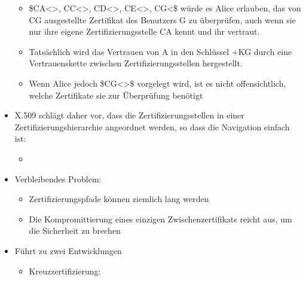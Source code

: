\documentclass[a4paper]{article}
\begin{document}
\begin{multicols}{3}
\begin{itemize}
              \begin{itemize}
                  \item
                        \$CA\textless{}\textgreater, CC\textless{}\textgreater,
                        CD\textless{}\textgreater, CE\textless{}\textgreater,
                        CG\textless{}\$ würde es Alice erlauben, das von CG ausgestellte
                        Zertifikat des Benutzers G zu überprüfen, auch wenn sie nur ihre
                        eigene Zertifizierungsstelle CA kennt und ihr vertraut.
                  \item
                        Tatsächlich wird das Vertrauen von A in den Schlüssel +KG durch eine
                        Vertrauenskette zwischen Zertifizierungsstellen hergestellt.
                  \item
                        Wenn Alice jedoch \$CG\textless{}\textgreater\$ vorgelegt wird, ist
                        es nicht offensichtlich, welche Zertifikate sie zur Überprüfung
                        benötigt
              \end{itemize}
        \item
              X.509 schlägt daher vor, dass die Zertifizierungsstellen in einer
              Zertifizierungshierarchie angeordnet werden, so dass die Navigation
              einfach ist:

              \begin{itemize}
                  \item
              \end{itemize}
        \item
              Verbleibendes Problem:

              \begin{itemize}
                  \item
                        Zertifizierungspfade können ziemlich lang werden
                  \item
                        Die Kompromittierung eines einzigen Zwischenzertifikats reicht aus,
                        um die Sicherheit zu brechen
              \end{itemize}
        \item
              Führt zu zwei Entwicklungen

              \begin{itemize}
                  \item
                        Kreuzzertifizierung:


\end{itemize}
\end{itemize}
\end{multicols}
\end{document}

